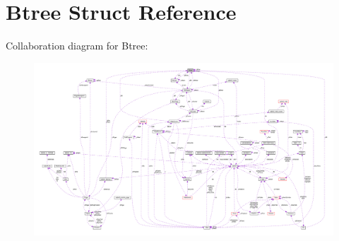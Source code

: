 \hypertarget{structBtree}{}\section{Btree Struct Reference}
\label{structBtree}


Collaboration diagram for Btree\+:\nopagebreak
\begin{figure}[H]
\begin{center}
\leavevmode
\includegraphics[width=350pt]{structBtree__coll__graph}
\end{center}
\end{figure}
